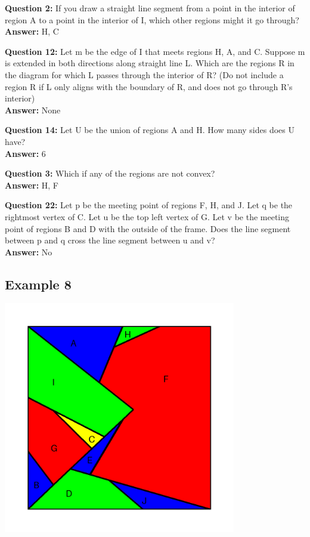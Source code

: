 \documentclass{article}    %
\begin{document}
{\bf Question  2:} If you draw a straight line segment from a point in the interior of region A to  a point in the interior of I, which other regions might it go through? \\
{\bf Answer:}  {H, C}

{\bf Question  12:} Let m be the edge of I that meets regions H, A, and C. Suppose m is extended in both directions along straight line L. Which are the regions R in the diagram for which L passes through the interior of R? (Do not include a region R if L only aligns with the boundary of R, and does not go through R's interior) \\
{\bf Answer:}  None

{\bf Question  14:} Let U be the union of regions A and H. How many sides does U have? \\
{\bf Answer:} 6

{\bf Question  3:} Which if any of the regions are not convex? \\
{\bf Answer:}  {H, F}

{\bf Question  22:} Let p be the meeting point of regions F, H, and J. Let q be the rightmost vertex of C. Let u be the top left vertex of G. Let v be the meeting point of regions B and D with the outside of the frame. Does the line segment between p and q cross the line segment between u and v? \\
{\bf Answer:}  No

\pagebreak

\subsection{Example 8}
\begin{center}
\includegraphics[height=4in]{Maps/RandomSetup7.png}
\end{center}
\end{document}
